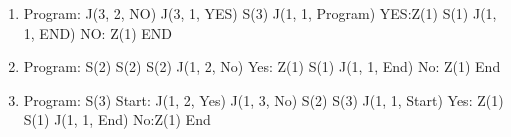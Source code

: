 \begin{enumerate}[label=\textbf{(\textit{\roman*})}]
    \item 
        Program: J(3, 2, NO) \newline
        \phantom{Program:} J(3, 1, YES) \newline
        \phantom{Program:} S(3)\newline
        \phantom{Program:} J(1, 1, Program) \newline
        YES:\hspace{0.9cm}Z(1)\newline
        \phantom{Program:} S(1)\newline
        \phantom{Program:} J(1, 1, END)\newline
        NO: \hspace{.9cm}Z(1)\newline
        END
    \item 
        Program: S(2) \newline
        \phantom{Program:} S(2)\newline
        \phantom{Program:} S(2)\newline
        \phantom{Program:} J(1, 2, No)\newline
        Yes:\hspace{0.9cm} Z(1)\newline
        \phantom{Program:} S(1)\newline
        \phantom{Program:} J(1, 1, End)\newline
        No: \hspace{0.9cm}Z(1) \newline
        End
    \item 
        Program: S(3)\newline
        Start: \hspace{0.4cm} J(1, 2, Yes)\newline
        \phantom{Program:} J(1, 3, No)\newline
        \phantom{Program:} S(2)\newline
        \phantom{Program:} S(3)\newline
        \phantom{Program:} J(1, 1, Start)\newline
        Yes:\hspace{0.9cm} Z(1)\newline
        \phantom{Program:} S(1)\newline
        \phantom{Program:} J(1, 1, End)\newline
        No:\hspace{1.2cm}Z(1) \newline
        End
\end{enumerate}
